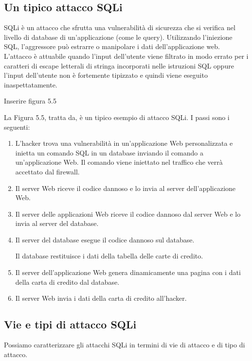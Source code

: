 \subsection{Un tipico attacco SQLi}
SQLi è un attacco che sfrutta una vulnerabilità di sicurezza che si verifica nel livello di database di un'applicazione (come le query). Utilizzando l'iniezione SQL, l'aggressore può estrarre o manipolare i dati dell'applicazione web.
L'attacco è attuabile quando l'input dell'utente viene filtrato in modo errato per i caratteri di escape letterali di stringa incorporati nelle istruzioni SQL oppure l'input dell'utente non è fortemente tipizzato e quindi viene eseguito inaspettatamente.

Inserire figura 5.5

La Figura 5.5, tratta da, è un tipico esempio di attacco SQLi. I passi sono i seguenti:

\begin{enumerate}
    \item L'hacker trova una vulnerabilità in un'applicazione Web personalizzata e inietta un comando SQL in un database inviando il comando a un'applicazione Web. Il comando viene iniettato nel traffico che verrà accettato dal firewall.
    
    \item Il server Web riceve il codice dannoso e lo invia al server dell'applicazione Web.
    
    \item Il server delle applicazioni Web riceve il codice dannoso dal server Web e lo invia al server del database.
    
    \item  Il server del database esegue il codice dannoso sul database.
    
    Il database restituisce i dati della tabella delle carte di credito.
    
    \item  Il server dell'applicazione Web genera dinamicamente una pagina con i dati della carta di credito dal database.
    
    \item  Il server Web invia i dati della carta di credito all'hacker.
\end{enumerate}
\newpage
\subsection{Vie e tipi di attacco SQLi}
Possiamo caratterizzare gli attacchi SQLi in termini di vie di attacco e di tipo di attacco.


